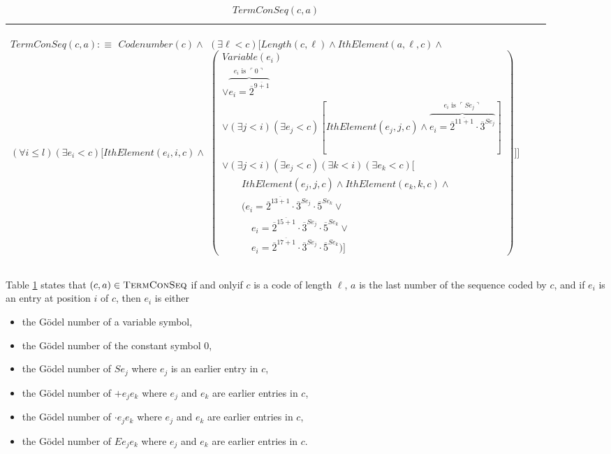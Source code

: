 \documentclass[11pt,letterpaper]{book}
\theoremstyle{definition}
\begin{document}
\begin{table}[h]
\caption{$TermConSeq(c, a)$}
\label{box:term_con_seq}
\begin{tabular}{|p{0.9\linewidth}|}
\hline
\rule{0pt}{3ex}
\begin{center}
$TermConSeq(c, a) : \equiv $
$Codenumber(c) \land  $
$ (\exists \ell < c) \bigg[ Length(c, \ell) \land IthElement(a, \ell, c) \land $
$ (\forall i \leq l )(\exists e_i < c) \big[ IthElement(e_i, i, c) \land  $
$ \left( \begin{array}{l}
Variable(e_i) \\
\lor \overbrace{ e_i = \overline{2}^{\overline{9 + 1}} }^{e_i \text{ is } \ulcorner 0 \urcorner }  \\
\lor (\exists j < i) (\exists e_j < c) [ IthElement(e_j , j, c) \land \overbrace{ e_i = \overline{2}^{\overline{11+1}} \cdot \overline{3}^{S e_j} }^{e_i \text{ is } \ulcorner S e_j \urcorner} ] \\
\lor (\exists j < i) (\exists e_j < c) (\exists k < i) (\exists e_k < c) \big[ \\
\quad \quad IthElement(e_j , j, c) \land IthElement(e_k , k, c) \land \\
\quad \quad \big( e_i = \overline{2}^{\overline{13+1}} \cdot \overline{3}^{S e_j} \cdot \overline{5}^{S e_k} \lor \\
\quad \quad \quad e_i = \overline{2}^{\overline{15+1}} \cdot \overline{3}^{S e_j} \cdot \overline{5}^{S e_k} \lor \\
\quad \quad \quad e_i = \overline{2}^{\overline{17+1}} \cdot \overline{3}^{S e_j} \cdot \overline{5}^{S e_k} \big) \big]
\end{array} \right)  \big] \bigg]$
\end{center}\\
\hline
\end{tabular}
\end{table}

Table \ref{box:term_con_seq} states that $(c, a) \in \text{\textsc{TermConSeq}}$ if and onlyif $c$ is a code of length $\ell$, $a$ is the last number of the sequence coded by $c$, and if $e_i$ is an entry at position $i$ of $c$, then $e_i$ is either
\begin{itemize}
\item{the G\"odel number of a variable symbol,}
\item{the G\"odel number of the constant symbol $0$,}
\item{the G\"odel number of $S e_j$ where $e_j$ is an earlier entry in $c$,}
\item{the G\"odel number of $+ e_j e_k$ where $e_j$ and $e_k$ are earlier entries in $c$,}
\item{the G\"odel number of $\cdot e_j e_k$ where $e_j$ and $e_k$ are earlier entries in $c$,}
\item{the G\"odel number of $E e_j e_k$ where $e_j$ and $e_k$ are earlier entries in $c$.}
\end{itemize}
\end{document}
